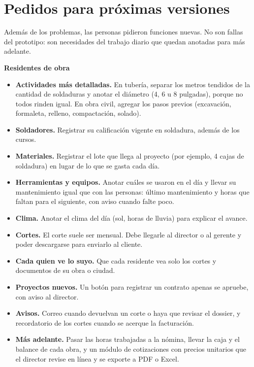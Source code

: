 \documentclass[11pt]{article}
\begin{document}
\section{Pedidos para próximas versiones}

Además de los problemas, las personas pidieron funciones nuevas. No son fallas del
prototipo: son necesidades del trabajo diario que quedan anotadas para más adelante.

\textbf{Residentes de obra}
\begin{itemize}
  \item \textbf{Actividades más detalladas.} En tubería, separar los metros tendidos de la cantidad de soldaduras y anotar el diámetro (4, 6 u 8 pulgadas), porque no todos rinden igual. En obra civil, agregar los pasos previos (excavación, formaleta, relleno, compactación, solado).
  \item \textbf{Soldadores.} Registrar su calificación vigente en soldadura, además de los cursos.
  \item \textbf{Materiales.} Registrar el lote que llega al proyecto (por ejemplo, 4 cajas de soldadura) en lugar de lo que se gasta cada día.
  \item \textbf{Herramientas y equipos.} Anotar cuáles se usaron en el día y llevar su mantenimiento igual que con las personas: último mantenimiento y horas que faltan para el siguiente, con aviso cuando falte poco.
  \item \textbf{Clima.} Anotar el clima del día (sol, horas de lluvia) para explicar el avance.
  \item \textbf{Cortes.} El corte suele ser mensual. Debe llegarle al director o al gerente y poder descargarse para enviarlo al cliente.
  \item \textbf{Cada quien ve lo suyo.} Que cada residente vea solo los cortes y documentos de su obra o ciudad.
  \item \textbf{Proyectos nuevos.} Un botón para registrar un contrato apenas se apruebe, con aviso al director.
  \item \textbf{Avisos.} Correo cuando devuelvan un corte o haya que revisar el dossier, y recordatorio de los cortes cuando se acerque la facturación.
  \item \textbf{Más adelante.} Pasar las horas trabajadas a la nómina, llevar la caja y el balance de cada obra, y un módulo de cotizaciones con precios unitarios que el director revise en línea y se exporte a PDF o Excel.
\end{itemize}
\end{document}
